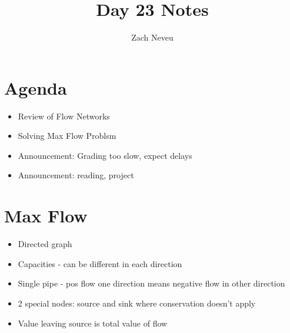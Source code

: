 \documentclass[12pt, letter]{article}
\author{Zach Neveu}
\title{ Day 23 Notes }
\begin{document}
\maketitle
\section{Agenda}%
\label{sec:agenda}
\begin{itemize}
	\item Review of Flow Networks
	\item Solving Max Flow Problsm
	\item Announcement: Grading too slow, expect delays
	\item Announcement: reading, project
\end{itemize}

\section{Max Flow}%
\label{sec:max_flow}
\begin{itemize}
	\item Directed graph
	\item Capacities - can be different in each direction
	\item Single pipe - pos flow one direction means negative flow in other direction
	\item 2 special nodes: source and sink where conservation doesn't apply
	\item Value leaving source is total value of flow
\end{itemize}
\end{document}
